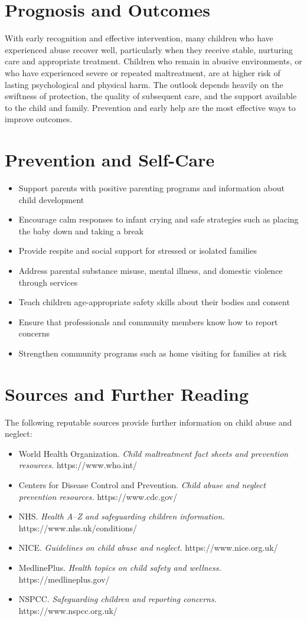 \section*{Prognosis and Outcomes}
With early recognition and effective intervention, many children who have experienced abuse recover well, particularly when they receive stable, nurturing care and appropriate treatment. Children who remain in abusive environments, or who have experienced severe or repeated maltreatment, are at higher risk of lasting psychological and physical harm. The outlook depends heavily on the swiftness of protection, the quality of subsequent care, and the support available to the child and family. Prevention and early help are the most effective ways to improve outcomes.

\section*{Prevention and Self-Care}
\begin{itemize}
    \item Support parents with positive parenting programs and information about child development
    \item Encourage calm responses to infant crying and safe strategies such as placing the baby down and taking a break
    \item Provide respite and social support for stressed or isolated families
    \item Address parental substance misuse, mental illness, and domestic violence through services
    \item Teach children age-appropriate safety skills about their bodies and consent
    \item Ensure that professionals and community members know how to report concerns
    \item Strengthen community programs such as home visiting for families at risk
\end{itemize}

\section*{Sources and Further Reading}
The following reputable sources provide further information on child abuse and neglect:
\begin{itemize}
    \item World Health Organization. \textit{Child maltreatment fact sheets and prevention resources.} https://www.who.int/
    \item Centers for Disease Control and Prevention. \textit{Child abuse and neglect prevention resources.} https://www.cdc.gov/
    \item NHS. \textit{Health A--Z and safeguarding children information.} https://www.nhs.uk/conditions/
    \item NICE. \textit{Guidelines on child abuse and neglect.} https://www.nice.org.uk/
    \item MedlinePlus. \textit{Health topics on child safety and wellness.} https://medlineplus.gov/
    \item NSPCC. \textit{Safeguarding children and reporting concerns.} https://www.nspcc.org.uk/
\end{itemize}

